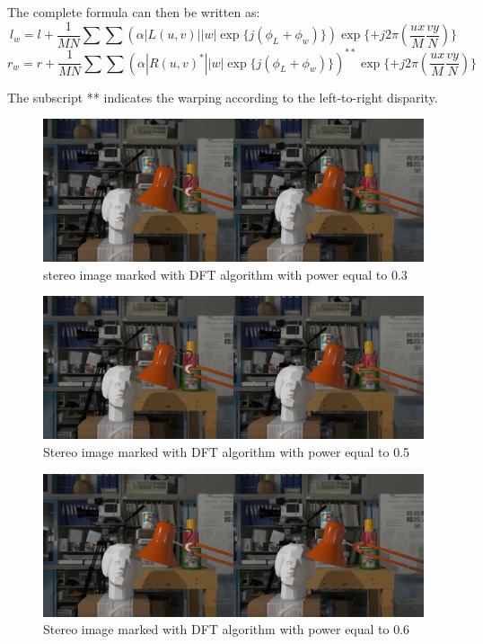 The complete formula can then be written as: 
$$ l_{w} = l + \frac{1}{MN}\sum\sum(\alpha|L(u,v)||w|\exp\{j(\phi_{L}+\phi_{w})\})\exp\{+j2\pi(\frac{ux}{M}\frac{vy}{N})\} $$
$$ r_{w} = r + \frac{1}{MN}\sum\sum(\alpha|R(u,v)^{*}||w|\exp\{j(\phi_{L}+\phi_{w})\})^{**}\exp\{+j2\pi(\frac{ux}{M}\frac{vy}{N})\} $$

The subscript ** indicates the warping according to the left-to-right disparity.

\begin{figure}[h!]
\centering
\includegraphics[width=1\textwidth]{./img/marked_03_DFT.png}
\caption{\small{stereo image marked with DFT algorithm with power equal to 0.3}}
\label{fig:dft03}
\end{figure}
\begin{figure}[h!]
\centering
\includegraphics[width=1\textwidth]{./img/marked_05_DFT.png}
\caption{\small{Stereo image marked with DFT algorithm with power equal to 0.5}}
\label{fig:dft05}
\end{figure}
\begin{figure}[h!]
\centering
\includegraphics[width=1\textwidth]{./img/marked_06_DFT.png}
\caption{\small{Stereo image marked with DFT algorithm with power equal to 0.6}}
\label{fig:dft06}
\end{figure}
